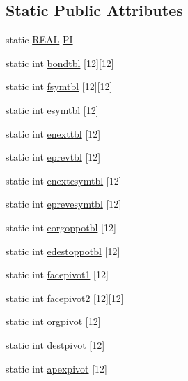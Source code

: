 \subsection*{Static Public Attributes}
\begin{DoxyCompactItemize}
\item 
static \hyperlink{tetgen_8h_a4b654506f18b8bfd61ad2a29a7e38c25}{R\+E\+AL} \hyperlink{classtetgenmesh_ad6766e0d2dbbf0a642793fbd6ef98ae2}{PI}
\item 
static int \hyperlink{classtetgenmesh_adac3450a64785be38ed9866bbf319b27}{bondtbl} \mbox{[}12\mbox{]}\mbox{[}12\mbox{]}
\item 
static int \hyperlink{classtetgenmesh_ade5fcec1e8e98d7919a0b6b4f80d49f4}{fsymtbl} \mbox{[}12\mbox{]}\mbox{[}12\mbox{]}
\item 
static int \hyperlink{classtetgenmesh_a593020d8815632ab48f2d913cdcf945d}{esymtbl} \mbox{[}12\mbox{]}
\item 
static int \hyperlink{classtetgenmesh_a0a9b3aae0da732d2a10b9aed3bee2ae2}{enexttbl} \mbox{[}12\mbox{]}
\item 
static int \hyperlink{classtetgenmesh_aa2db6a67091cbcb4ce789feba24decf2}{eprevtbl} \mbox{[}12\mbox{]}
\item 
static int \hyperlink{classtetgenmesh_a0912421ad4138418f65acceba55ee2c3}{enextesymtbl} \mbox{[}12\mbox{]}
\item 
static int \hyperlink{classtetgenmesh_ac4c4d164c13738b82c899a1a54fbed85}{eprevesymtbl} \mbox{[}12\mbox{]}
\item 
static int \hyperlink{classtetgenmesh_a36a32bfa41c59df53ecce0940169517f}{eorgoppotbl} \mbox{[}12\mbox{]}
\item 
static int \hyperlink{classtetgenmesh_a73e1e70d9ad81d842d64d8c4ea63d195}{edestoppotbl} \mbox{[}12\mbox{]}
\item 
static int \hyperlink{classtetgenmesh_a55087a0dd887131c807b98dc0fc9af16}{facepivot1} \mbox{[}12\mbox{]}
\item 
static int \hyperlink{classtetgenmesh_abca931a635c5666f995cec0ae083f563}{facepivot2} \mbox{[}12\mbox{]}\mbox{[}12\mbox{]}
\item 
static int \hyperlink{classtetgenmesh_a2d4dec99287ab03f591d80d6fa70c70a}{orgpivot} \mbox{[}12\mbox{]}
\item 
static int \hyperlink{classtetgenmesh_a7b2f9c12c3b256abf6165807073b12f3}{destpivot} \mbox{[}12\mbox{]}
\item 
static int \hyperlink{classtetgenmesh_aeb8d6ba96d5e91957ba7618e72edd9f2}{apexpivot} \mbox{[}12\mbox{]}

\end{DoxyCompactItemize}
